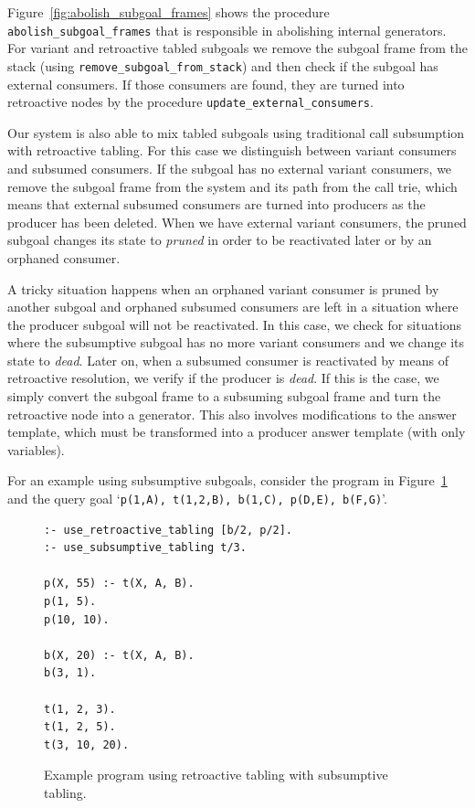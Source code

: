 Figure~\ref{fig:abolish_subgoal_frames} shows the procedure \texttt{abolish\_subgoal\_frames} that is
responsible in abolishing internal generators. For variant and retroactive tabled subgoals we remove
the subgoal frame from the stack (using \texttt{remove\_subgoal\_from\_stack}) and then check if the
subgoal has external consumers. If those consumers are found, they are turned into retroactive nodes
by the procedure \texttt{update\_external\_consumers}.

Our system is also able to mix tabled subgoals using traditional call subsumption with retroactive tabling.
For this case we distinguish between variant consumers and subsumed consumers.
If the subgoal has no external variant consumers, we remove the subgoal frame from the system and
its path from the call trie, which means that external subsumed consumers are turned into producers as
the producer has been deleted. When we have external variant consumers, the pruned subgoal changes its state
to \textit{pruned} in order to be reactivated later or by an orphaned consumer.

A tricky situation happens when an orphaned variant consumer is pruned by another subgoal and orphaned
subsumed consumers are left in a situation where the producer subgoal will not be reactivated. In this case,
we check for situations where the subsumptive subgoal has no more variant consumers and we change its state
to \textit{dead}. Later on, when a subsumed consumer is reactivated by means of retroactive resolution, we
verify if the producer is \textit{dead}. If this is the case, we simply convert the subgoal frame to a
subsuming subgoal frame and turn the retroactive node into a generator. This also involves modifications
to the answer template, which must be transformed into a producer answer template (with only variables).

For an example using subsumptive subgoals, consider the program in Figure~\ref{fig:retro_sub} and
the query goal `\texttt{p(1,A),~t(1,2,B),~b(1,C),~p(D,E),~b(F,G)}'.

\begin{figure}[ht]
\begin{Verbatim}
:- use_retroactive_tabling [b/2, p/2].
:- use_subsumptive_tabling t/3.

p(X, 55) :- t(X, A, B).
p(1, 5).
p(10, 10).

b(X, 20) :- t(X, A, B).
b(3, 1).

t(1, 2, 3).
t(1, 2, 5).
t(3, 10, 20).
\end{Verbatim}
\caption{Example program using retroactive tabling with subsumptive tabling.}
\label{fig:retro_sub}
\end{figure}

